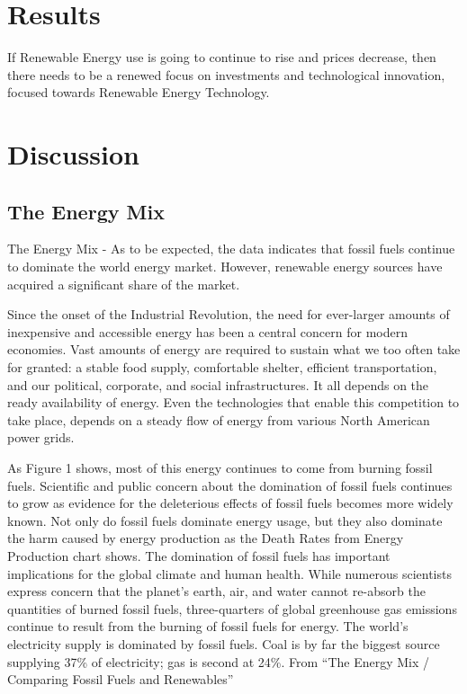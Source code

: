 \documentclass[10pt,twocolumn,letterpaper]{article}
\begin{document}
\section{Results}
If Renewable Energy use is going to continue to rise and prices decrease, then there needs to be a renewed focus on investments and technological innovation, focused towards Renewable Energy Technology. 




\section{Discussion}



\subsection{The Energy Mix} 

The Energy Mix - As to be expected, the data indicates that fossil fuels continue to dominate the world energy market. However, renewable energy sources have acquired a significant share of the market. 

Since the onset of the Industrial Revolution, the need for ever-larger amounts of inexpensive and accessible energy has been a central concern for modern economies. Vast amounts of energy are required to sustain what we too often take for granted: a stable food supply, comfortable shelter, efficient transportation, and our political, corporate, and social infrastructures. It all depends on the ready availability of energy. Even the technologies that enable this competition to take place, depends on a steady flow of energy from various North American power grids.

As Figure 1 shows, most of this energy continues to come from burning fossil fuels.
Scientific and public concern about the domination of fossil fuels continues to grow as evidence for the deleterious effects of fossil fuels becomes more widely known. Not only do fossil fuels dominate energy usage, but they also dominate the harm caused by energy production as the Death Rates from Energy Production chart shows. The domination of fossil fuels has important implications for the global climate and human health. While numerous scientists express concern that the planet’s earth, air, and water cannot re-absorb the quantities of burned fossil fuels, three-quarters of global greenhouse gas emissions continue to result from the burning of fossil fuels for energy. The world’s electricity supply is dominated by fossil fuels. Coal is by far the biggest source supplying 37\% of electricity; gas is second at 24\%. From “The Energy Mix / Comparing Fossil Fuels and Renewables”
\end{document}
